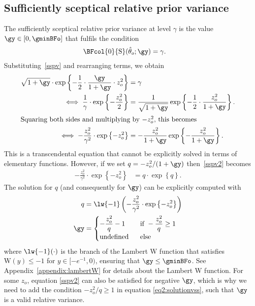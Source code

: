 \begin{subappendices}
  \renewcommand{\thesection}{\Alph{section}}

\section{Sufficiently sceptical relative prior variance}
\label{appendix:ssrv}
The sufficiently sceptical relative prior variance at level $\gamma$ is the
value $\gy \in [0, \gminBFo]$ that fulfils the condition
\begin{align}
  \label{sspv}
  \BFcol{0}{\text{S}}(\hat{\theta}_o; \gy)
  &= \gamma.
\end{align}
Substituting~\eqref{sspv} and rearranging terms, we obtain
\begin{align}
  \label{sspv2}
  \sqrt{1 + \gy} \cdot
  \exp\left\{-\frac{1}{2} \cdot
  \frac{\gy}{1 + \gy} \cdot z^2_o\right\}
  &= \gamma \nonumber \\
  \iff \frac{1}{\gamma} \cdot \exp\left\{-\frac{z_o^2}{2}\right\}
  &= \frac{1}{\sqrt{1 + \gy}} \exp\left\{-\frac{1}{2} \cdot
  \frac{z_o^2}{1 + \gy}\right\}. \nonumber
  \\
  \intertext{Squaring both sides and multiplying by $-z_o^2$, this becomes}
  \iff -\frac{z_o^2}{\gamma^2} \cdot \exp\left\{-z_o^2\right\}
  &= -\frac{z_o^2}{1 + \gy}
  \exp\left\{-\frac{z_o^2}{1 + \gy}\right\}.
\end{align}
This is a transcendental equation that cannot be explicitly solved in terms of
elementary functions. However, if we set $q = -z_o^2/(1 + \gy)$
then~\eqref{sspv2} becomes
\begin{align*}
  -\frac{z_o^2}{\gamma^2} \cdot \exp\left\{-z_o^2\right\}
  &= q \cdot \exp\left\{q\right\}.
\end{align*}
The solution for $q$ (and consequently for $\gy$) can be explicitly computed
with
\begin{align}
\label{eq2:solutionvss}
  q &= \lw{-1}\left(-\frac{z_o^2}{\gamma^2} \cdot \exp\left\{-z_o^2\right\}\right)
  \nonumber \\
  \gy &=
  \begin{cases}
    -\dfrac{z_o^2}{q} - 1 & ~~ \text{if} ~ -\dfrac{z_o^2}{q} \geq 1 \\
    \text{undefined} & ~~ \text{else}
  \end{cases}
\end{align}
where $\lw{-1}(\cdot)$ is the branch of the Lambert W function that satisfies
$\mathrm{W}(y) \leq -1$ for \mbox{$y \in [-e^{-1}, 0)$}, ensuring that
$\gy \leq \gminBFo$. See Appendix~\ref{appendix:lambertW} for details about the
Lambert W function. For some $z_o$, equation \eqref{sspv2} can also be satisfied
for negative $\gy$, which is why we need to add the condition $-z_o^2/q \geq 1$
in equation \eqref{eq2:solutionvss}, such that $\gy$ is a valid relative
variance.


\end{subappendices}
